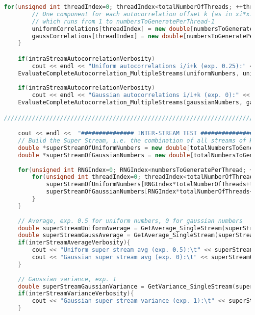 \begin{lstlisting}[language=C++, caption={\texttt{libraries/CoreLibraries/RandomGenerator/CorrelationTest.cu}}]
	for(unsigned int threadIndex=0; threadIndex<totalNumberOfThreads; ++threadIndex){
		// One component for each autocorrelation offset k (as in xi*xi+k)
		// which runs from 1 to numbersToGeneratePerThread-1
		uniformCorrelations[threadIndex] = new double[numbersToGeneratePerThread-2];	
		gaussCorrelations[threadIndex] = new double[numbersToGeneratePerThread-2];
	}

	if(intraStreamAutocorrelationVerbosity)
		cout << endl << "Uniform autocorrelations i/i+k (exp. 0.25):" << endl;
	EvaluateCompleteAutocorrelation_MultipleStreams(uniformNumbers, uniformCorrelations, totalNumberOfThreads, numbersToGeneratePerThread, intraStreamAutocorrelationVerbosity);
	
	if(intraStreamAutocorrelationVerbosity)
		cout << endl << "Gaussian autocorrelations i/i+k (exp. 0):" << endl;
	EvaluateCompleteAutocorrelation_MultipleStreams(gaussianNumbers, gaussCorrelations, totalNumberOfThreads, numbersToGeneratePerThread, intraStreamAutocorrelationVerbosity);

///////////////////////////////////////////////////////////////////////////////////////////////////////

	cout << endl <<  "############### INTER-STREAM TEST ###############" << endl;
	// Build the Super Stream, i.e. the combination of all streams of RNGs
	double *superStreamOfUniformNumbers = new double[totalNumbersToGenerate];
	double *superStreamOfGaussianNumbers = new double[totalNumbersToGenerate];
	
	for(unsigned int RNGIndex=0; RNGIndex<numbersToGeneratePerThread; ++RNGIndex){
		for(unsigned int threadIndex=0; threadIndex<totalNumberOfThreads; ++threadIndex){
			superStreamOfUniformNumbers[RNGIndex*totalNumberOfThreads+threadIndex] = uniformNumbers[threadIndex][RNGIndex];
			superStreamOfGaussianNumbers[RNGIndex*totalNumberOfThreads+threadIndex] = gaussianNumbers[threadIndex][RNGIndex];
		}
	}
	
	// Average, exp. 0.5 for uniform numbers, 0 for gaussian numbers
	double superStreamUniformAverage = GetAverage_SingleStream(superStreamOfUniformNumbers, totalNumbersToGenerate);
	double superStreamGaussAverage = GetAverage_SingleStream(superStreamOfGaussianNumbers, totalNumbersToGenerate);
	if(interStreamAverageVerbosity){
		cout << "Uniform super stream avg (exp. 0.5):\t" << superStreamUniformAverage << endl;
		cout << "Gaussian super stream avg (exp. 0):\t" << superStreamGaussAverage << endl;
	}
	
	// Gaussian variance, exp. 1
	double superStreamGaussianVariance = GetVariance_SingleStream(superStreamOfGaussianNumbers, superStreamGaussAverage, totalNumbersToGenerate);
	if(interStreamVarianceVerbosity){
		cout << "Gaussian super stream variance (exp. 1):\t" << superStreamGaussianVariance << endl;
	}
	

\end{lstlisting}
